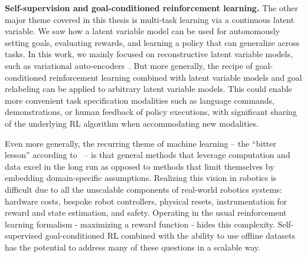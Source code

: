 \vspace{5mm}

\textbf{Self-supervision and goal-conditioned reinforcement learning.} 
The other major theme covered in this thesis is multi-task learning via a continuous latent variable.
We saw how a latent variable model can be used for autonomously setting goals, evaluating rewards, and learning a policy that can generalize across tasks.
In this work, we mainly focused on reconstructive latent variable models, such as variational auto-encoders~\citep{kingma2014vae}.
But more generally, the recipe of goal-conditioned reinforcement learning combined with latent variable models and goal relabeling can be applied to arbitrary latent variable models.
This could enable more convenient task specification modalities such as language commands, demonstrations, or human feedback of policy executions, with significant sharing of the underlying RL algorithm when accommodating new modalities.

Even more generally, the recurring theme of machine learning -- the ``bitter lesson'' according to~\citet{sutton2019bitter} -- is that general methods that leverage computation and data excel in the long run as opposed to methods that limit themselves by embedding domain-specific assumptions.
Realizing this vision in robotics is difficult due to all the unscalable components of real-world robotics systems: hardware costs, bespoke robot controllers, physical resets, instrumentation for reward and state estimation, and safety.
Operating in the usual reinforcement learning formalism - maximizing a reward function - hides this complexity.
Self-supervised goal-conditioned RL combined with the ability to use offline datasets has the potential to address many of these questions in a scalable way.
